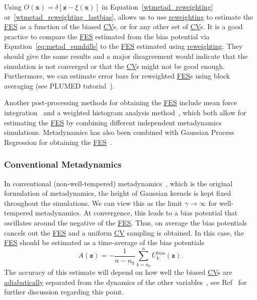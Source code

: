 \documentclass[9pt,review]{livecoms}
\newcommand{\vx}{\mathbf{x}}
\newcommand{\vz}{\mathbf{z}}
\begin{document}
Using $O(\vx) = \delta[\vz-\xi(\vx)]$ in Equation~\ref{wtmetad_reweighting} or~\ref{wtmetad_reweighting_lastbias}, allows us to use \hyperlink{ref:Reweighting} {reweighting} to estimate the \hyperlink{ref:FES} {FES} as a function of the biased \hyperlink{ref:CV} {CV}s, or for any other set of \hyperlink{ref:CV} {CV}s. It is a good practice to compare the \hyperlink{ref:FES} {FES} estimated from the bias potential via Equation~\ref{eq:metad_sumhills} to the \hyperlink{ref:FES} {FES} estimated using \hyperlink{ref:Reweighting} {reweighting}. They should give the same results and a major disagreement would indicate that the simulation is not converged or that the \hyperlink{ref:CV} {CV}s might not be good enough. Furthermore, we can estimate error bars for reweighted \hyperlink{ref:FES} {FES}s using block averaging (see PLUMED tutorial~\cite{plumed_masterclass}).

Another post-processing methods for obtaining the \hyperlink{ref:FES} {FES} include mean force integration~\cite{10.1063/1.5123498} and a weighted histogram analysis method~\cite{10.1016/j.cplett.2020.137384}, which both allow for estimating the \hyperlink{ref:FES} {FES} by combining different independent metadynamics simulations. Metadynamics has also been combined with Gaussian Process Regression for obtaining the \hyperlink{ref:FES} {FES}~\cite{Mones2016}.


\subsubsection{Conventional Metadynamics}
\label{sec:meta-classic}

In conventional (non-well-tempered) metadynamics~\cite{Laio-PNAS-2002}, which is the original formulation of metadynamics, the height of Gaussian kernels is kept fixed throughout the simulations. We can view this as the limit $
\gamma \to \infty$ for well-tempered metadynamics. At convergence, this leads to a bias potential that oscillates around the negative of the \hyperlink{ref:FES} {FES}. Thus, on average the bias potentials cancels out the \hyperlink{ref:FES} {FES} and a uniform \hyperlink{ref:CV} {CV} sampling is obtained. In this case, the \hyperlink{ref:FES} {FES} should be estimated as a time-average of the bias potentials~\cite{BussiLaio_ReviewMetaD_2020}
\begin{equation}
A(\vz) = - \frac{1}{n-n_0} \sum^{n}_{k=n_0} U^{\mathrm{bias}}_k(\vz).
\end{equation}
The accuracy of this estimate will depend on how well the biased \hyperlink{ref:CV} {CV}s are \hyperlink{ref:AdiabaticDyn} {adiabatically} separated from the dynamics of the other variables~\cite{laio-gervasio-08,jourdain-lelievre-zitt-21}, see Ref~\cite{BussiLaio_ReviewMetaD_2020} for further discussion regarding this point.
\end{document}
